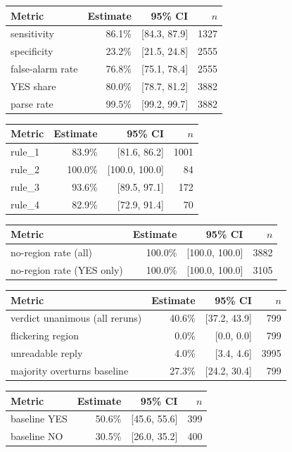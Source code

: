 \begin{tabular}{lrrr}
\toprule
Metric & Estimate & 95\% CI & $n$ \\
\midrule
sensitivity & 86.1\% & [84.3, 87.9] & 1327 \\
specificity & 23.2\% & [21.5, 24.8] & 2555 \\
false-alarm rate & 76.8\% & [75.1, 78.4] & 2555 \\
YES share & 80.0\% & [78.7, 81.2] & 3882 \\
parse rate & 99.5\% & [99.2, 99.7] & 3882 \\
\bottomrule
\end{tabular}

\begin{tabular}{lrrr}
\toprule
Metric & Estimate & 95\% CI & $n$ \\
\midrule
rule\_1 & 83.9\% & [81.6, 86.2] & 1001 \\
rule\_2 & 100.0\% & [100.0, 100.0] & 84 \\
rule\_3 & 93.6\% & [89.5, 97.1] & 172 \\
rule\_4 & 82.9\% & [72.9, 91.4] & 70 \\
\bottomrule
\end{tabular}

\begin{tabular}{lrrr}
\toprule
Metric & Estimate & 95\% CI & $n$ \\
\midrule
no-region rate (all) & 100.0\% & [100.0, 100.0] & 3882 \\
no-region rate (YES only) & 100.0\% & [100.0, 100.0] & 3105 \\
\bottomrule
\end{tabular}

\begin{tabular}{lrrr}
\toprule
Metric & Estimate & 95\% CI & $n$ \\
\midrule
verdict unanimous (all reruns) & 40.6\% & [37.2, 43.9] & 799 \\
flickering region & 0.0\% & [0.0, 0.0] & 799 \\
unreadable reply & 4.0\% & [3.4, 4.6] & 3995 \\
majority overturns baseline & 27.3\% & [24.2, 30.4] & 799 \\
\bottomrule
\end{tabular}

\begin{tabular}{lrrr}
\toprule
Metric & Estimate & 95\% CI & $n$ \\
\midrule
baseline YES & 50.6\% & [45.6, 55.6] & 399 \\
baseline NO & 30.5\% & [26.0, 35.2] & 400 \\
\bottomrule
\end{tabular}


